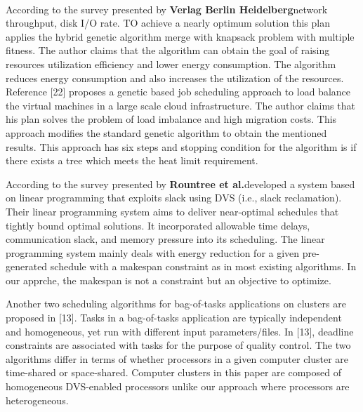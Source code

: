 \documentclass[a4paper,12pt]{report}
\begin{document}
{{{{		\paragraph{}
		{
			\linespread{1.5}
			According to the survey presented by \textbf{Verlag Berlin Heidelberg}network throughput, disk I/O rate. TO achieve a nearly optimum solution this plan
			applies the hybrid genetic algorithm merge with knapsack problem with multiple
			fitness. The author claims that the algorithm can obtain the goal of raising resources
			utilization efficiency and lower energy consumption. The algorithm reduces energy
			consumption and also increases the utilization of the resources.
			Reference [22] proposes a genetic based job scheduling approach to load balance the
			virtual machines in a large scale cloud infrastructure. The author claims that his plan
			solves the problem of load imbalance and high migration costs. This approach
			modifies the standard genetic algorithm to obtain the mentioned results. This approach
			has six steps and stopping condition for the algorithm is if there exists a tree which
			meets the heat limit requirement.
			
			
				\linespread{1.5}	According to the survey presented by \textbf{Rountree et al.}developed a system based on linear programming
				that exploits slack using DVS (i.e., slack reclamation). Their linear programming system aims to deliver near-optimal schedules that tightly bound optimal solutions. It incorporated allowable time delays, communication slack,
				and memory pressure into its scheduling. The linear programming system
				mainly deals with energy reduction for a given pre-generated schedule with
				a makespan constraint as in most existing algorithms. In our apprche, the
				makespan is not a constraint but an objective to optimize.
				\par Another two scheduling algorithms for bag-of-tasks applications on clusters are proposed in [13]. Tasks in a bag-of-tasks application are typically
				independent and homogeneous, yet run with different input parameters/files.
				In [13], deadline constraints are associated with tasks for the purpose of quality control. The two algorithms differ in terms of whether processors in a
				given computer cluster are time-shared or space-shared. Computer clusters
				in this paper are composed of homogeneous DVS-enabled processors unlike
				our approach where processors are heterogeneous.
				
}}}}}
\end{document}
